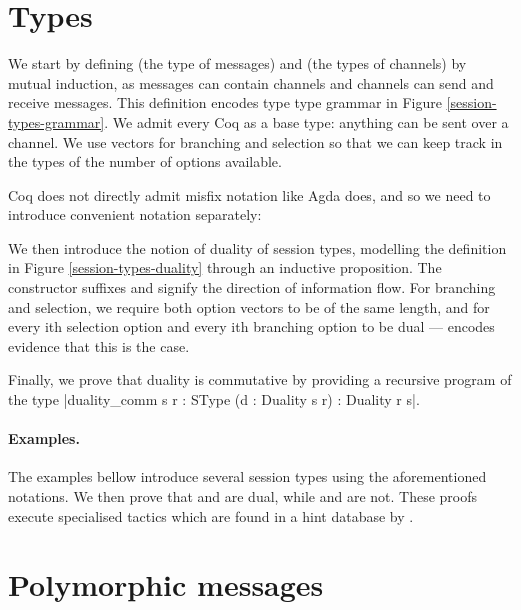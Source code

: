 \documentclass{mproj}
\begin{document}
\section{Types}\label{types}

We start by defining  (the type of messages) and  (the types of channels) by mutual induction, as messages can contain channels and channels can send and receive messages. This definition encodes type type grammar in Figure \ref{session-types-grammar}. We admit every Coq  as a base type: anything can be sent over a channel. We use vectors for branching and selection so that we can keep track in the types of the number of options available.


Coq does not directly admit misfix notation like Agda does, and so we need to introduce convenient notation separately:


We then introduce the notion of duality of session types, modelling the definition in Figure \ref{session-types-duality} through an inductive proposition. The constructor suffixes  and  signify the direction of information flow. For branching and selection, we require both option vectors to be of the same length, and for every ith selection option and every ith branching option to be dual ---  encodes evidence that this is the case. 


Finally, we prove that duality is commutative by providing a recursive program of the type \coqe|duality_comm {s r : SType} (d : Duality s r) : Duality r s|.

\paragraph{Examples.}
The examples bellow introduce several session types using the aforementioned notations. We then prove that  and  are dual, while  and  are not. These proofs execute specialised tactics which are found in a hint database by .


\section{Polymorphic messages}\label{polymorphism}
\end{document}
